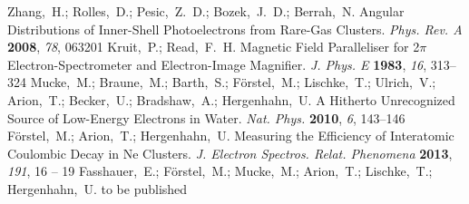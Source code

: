 \documentclass[journal=jpccck,manuscript=article]{achemso}
\begin{document}
\begin{mcitethebibliography}{73}
{\mcitedefaultendpunct}{\mcitedefaultseppunct}\relax
\EndOfBibitem
{}
Zhang,~H.; Rolles,~D.; Pesic,~Z.~D.; Bozek,~J.~D.; Berrah,~N. Angular
  Distributions of Inner-Shell Photoelectrons from Rare-Gas Clusters.
  \emph{Phys. Rev. A} \textbf{2008}, \emph{78}, 063201\relax
\mciteBstWouldAddEndPuncttrue
\mciteSetBstMidEndSepPunct{\mcitedefaultmidpunct}
{\mcitedefaultendpunct}{\mcitedefaultseppunct}\relax
\EndOfBibitem
{}
Kruit,~P.; Read,~F.~H. Magnetic Field Paralleliser for 2$\pi$
  Electron-Spectrometer and Electron-Image Magnifier. \emph{J. Phys. E}
  \textbf{1983}, \emph{16}, 313--324\relax
\mciteBstWouldAddEndPuncttrue
\mciteSetBstMidEndSepPunct{\mcitedefaultmidpunct}
{\mcitedefaultendpunct}{\mcitedefaultseppunct}\relax
\EndOfBibitem
{}
Mucke,~M.; Braune,~M.; Barth,~S.; F\"orstel,~M.; Lischke,~T.; Ulrich,~V.;
  Arion,~T.; Becker,~U.; Bradshaw,~A.; Hergenhahn,~U. A Hitherto Unrecognized
  Source of Low-Energy Electrons in Water. \emph{Nat. Phys.} \textbf{2010},
  \emph{6}, 143--146\relax
\mciteBstWouldAddEndPuncttrue
\mciteSetBstMidEndSepPunct{\mcitedefaultmidpunct}
{\mcitedefaultendpunct}{\mcitedefaultseppunct}\relax
\EndOfBibitem
{}
F\"orstel,~M.; Arion,~T.; Hergenhahn,~U. Measuring the Efficiency of
  Interatomic Coulombic Decay in Ne Clusters. \emph{J. Electron Spectros.
  Relat. Phenomena} \textbf{2013}, \emph{191}, 16 -- 19\relax
\mciteBstWouldAddEndPuncttrue
\mciteSetBstMidEndSepPunct{\mcitedefaultmidpunct}
{\mcitedefaultendpunct}{\mcitedefaultseppunct}\relax
\EndOfBibitem
{}
Fasshauer,~E.; F\"orstel,~M.; Mucke,~M.; Arion,~T.; Lischke,~T.; Hergenhahn,~U.
  to be published\relax
\mciteBstWouldAddEndPuncttrue
\mciteSetBstMidEndSepPunct{\mcitedefaultmidpunct}
{\mcitedefaultendpunct}{\mcitedefaultseppunct}\relax
\EndOfBibitem
\end{mcitethebibliography}
\end{document}
